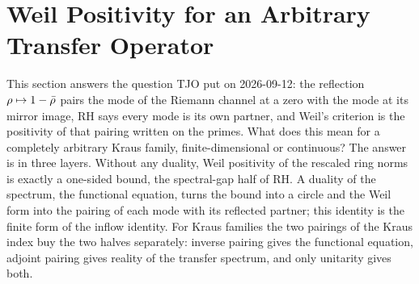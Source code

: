 
\section{Weil Positivity for an Arbitrary Transfer Operator}
\label{sec:weil-positivity}

This section answers the question TJO put on 2026-09-12: the reflection
$\rho\mapsto1-\bar{\rho}$ pairs the mode of the Riemann channel at a zero with the
mode at its mirror image, RH says every mode is its own partner, and Weil's
criterion is the positivity of that pairing written on the primes. What does this mean
for a completely arbitrary Kraus family, finite-dimensional or continuous? The answer is
in three layers. Without any duality, Weil positivity of the rescaled ring norms is
exactly a one-sided bound, the spectral-gap half of RH. A duality of the spectrum, the
functional equation, turns the bound into a circle and the Weil form into the pairing of
each mode with its reflected partner; this identity is the finite form of the inflow
identity. For Kraus families the two pairings of the Kraus index buy the two halves
separately: inverse pairing gives the functional equation, adjoint pairing gives reality
of the transfer spectrum, and only unitarity gives both.

